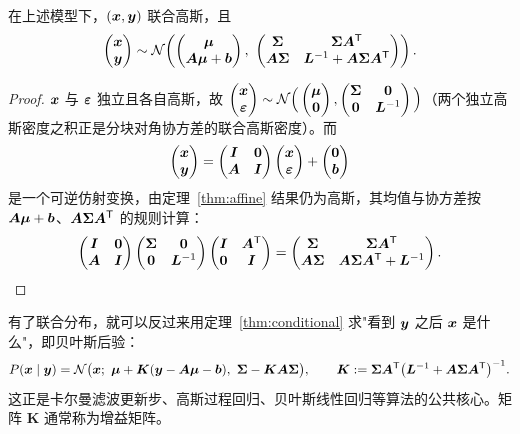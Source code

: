 \begin{proposition}
在上述模型下，$(\bm{x},\bm{y})$ 联合高斯，且
\[
\begin{pmatrix}\vx\\ \vy\end{pmatrix}\sim\Normal\!\left(
\begin{pmatrix}\vmu\\ \mA\vmu+\vb\end{pmatrix},\ 
\begin{pmatrix}\mSigma&\mSigma\mA^\T\\ \mA\mSigma&\mL^{-1}+\mA\mSigma\mA^\T\end{pmatrix}\right).
\]
\end{proposition}

\begin{proof}
$\bm{x}$ 与 $\bm{\varepsilon}$ 独立且各自高斯，故 $\begin{pmatrix}\bm{x}\\ \bm{\varepsilon}\end{pmatrix}\sim\mathcal{N}\Big(\begin{pmatrix}\bm{\mu}\\ \bm{0}\end{pmatrix},\begin{pmatrix}\bm{\Sigma}&\bm{0}\\ \bm{0}&\bm{L}^{-1}\end{pmatrix}\Big)$（两个独立高斯密度之积正是分块对角协方差的联合高斯密度）。而
\[
\begin{pmatrix}\bm{x}\\ \bm{y}\end{pmatrix}
=\begin{pmatrix}\bm{I}&\bm{0}\\ \bm{A}&\bm{I}\end{pmatrix}\begin{pmatrix}\bm{x}\\ \bm{\varepsilon}\end{pmatrix}+\begin{pmatrix}\bm{0}\\ \bm{b}\end{pmatrix}
\]
是一个可逆仿射变换，由定理~\ref{thm:affine} 结果仍为高斯，其均值与协方差按 $\bm{A}\bm{\mu}+\bm{b}$、$\bm{A}\bm{\Sigma}\bm{A}^{\mathsf{T}}$ 的规则计算：
\[
\begin{pmatrix}\bm{I}&\bm{0}\\ \bm{A}&\bm{I}\end{pmatrix}
\begin{pmatrix}\bm{\Sigma}&\bm{0}\\ \bm{0}&\bm{L}^{-1}\end{pmatrix}
\begin{pmatrix}\bm{I}&\bm{A}^{\mathsf{T}}\\ \bm{0}&\bm{I}\end{pmatrix}
=\begin{pmatrix}\bm{\Sigma}&\bm{\Sigma}\bm{A}^{\mathsf{T}}\\ \bm{A}\bm{\Sigma}&\bm{A}\bm{\Sigma}\bm{A}^{\mathsf{T}}+\bm{L}^{-1}\end{pmatrix}.
\]
\end{proof}

有了联合分布，就可以反过来用定理~\ref{thm:conditional} 求"看到 $\bm{y}$ 之后 $\bm{x}$ 是什么"，即贝叶斯后验：
\[
P(\vx\mid\vy)=\Normal\big(\vx;\ \vmu+\bm{K}(\vy-\mA\vmu-\vb),\ \mSigma-\bm{K}\mA\mSigma\big),\qquad
\bm{K}:=\mSigma\mA^\T\big(\mL^{-1}+\mA\mSigma\mA^\T\big)^{-1}.
\]
这正是卡尔曼滤波更新步、高斯过程回归、贝叶斯线性回归等算法的公共核心。矩阵 $\bm{K}$ 通常称为增益矩阵。

